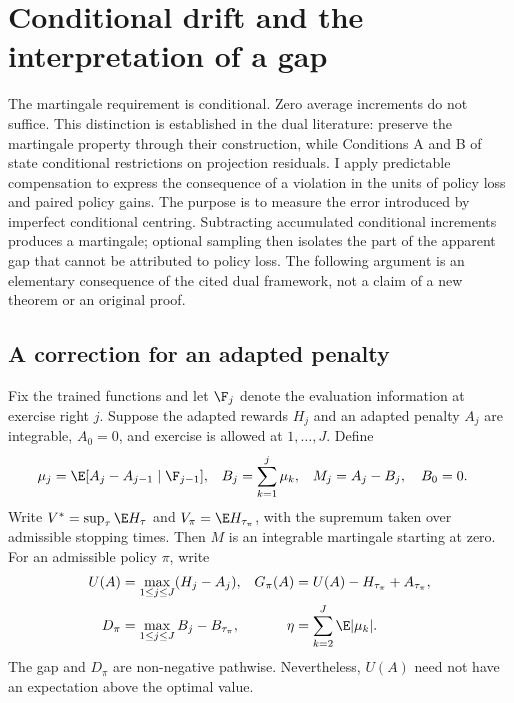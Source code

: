 \section{Conditional drift and the interpretation of a gap}
\label{app:drift}

The martingale requirement is conditional. Zero average increments do not suffice. This distinction is established in the dual literature: \citet{belomestny2009} preserve the martingale property through their construction, while Conditions A and B of \citet{cline2026} state conditional restrictions on projection residuals. I apply predictable compensation to express the consequence of a violation in the units of policy loss and paired policy gains. The purpose is to measure the error introduced by imperfect conditional centring. Subtracting accumulated conditional increments produces a martingale; optional sampling then isolates the part of the apparent gap that cannot be attributed to policy loss. The following argument is an elementary consequence of the cited dual framework, not a claim of a new theorem or an original proof.

\subsection{A correction for an adapted penalty}

Fix the trained functions and let $\F_j$ denote the evaluation information at exercise right $j$. Suppose the adapted rewards $H_j$ and an adapted penalty $A_j$ are integrable, $A_0=0$, and exercise is allowed at $1,\ldots,J$. Define
\begin{align}
 \mu_j&=\E[A_j-A_{j-1}\mid\F_{j-1}], &
 B_j&=\sum_{k=1}^j\mu_k, & M_j&=A_j-B_j,\quad B_0=0.
 \label{eq:compensator}
\end{align}
Write $V^*=\sup_\tau\E H_\tau$ and $V_\pi=\E H_{\tau_\pi}$, with the supremum taken over admissible stopping times. Then $M$ is an integrable martingale starting at zero. For an admissible policy $\pi$, write
\begin{align}
 U(A)&=\max_{1\leq j\leq J}(H_j-A_j), &
 G_\pi(A)&=U(A)-H_{\tau_\pi}+A_{\tau_\pi},\label{eq:adapted-gap}\\
 D_\pi&=\max_{1\leq j\leq J}B_j-B_{\tau_\pi}, &
 \eta&=\sum_{k=2}^J\E|\mu_k|.\label{eq:drift-budget}
\end{align}
The gap and $D_\pi$ are non-negative pathwise. Nevertheless, $U(A)$ need not have an expectation above the optimal value.

